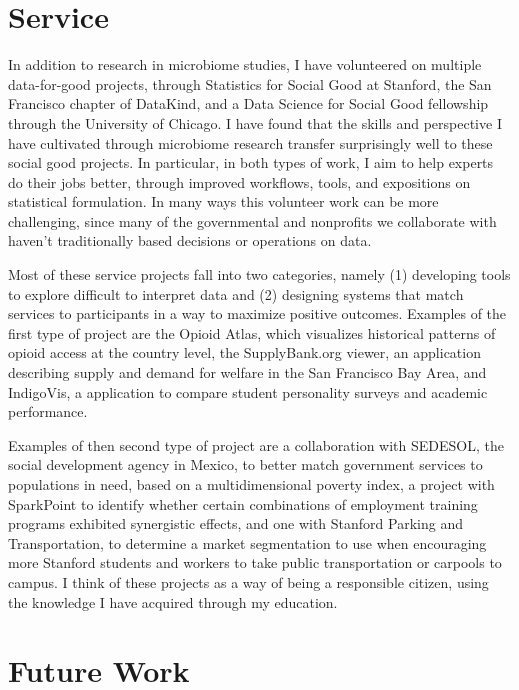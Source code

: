 \documentclass{article}
\begin{document}
\section{Service}

In addition to research in microbiome studies, I have volunteered on multiple
data-for-good projects, through Statistics for Social Good at Stanford, the San
Francisco chapter of DataKind, and a Data Science for Social Good fellowship
through the University of Chicago. I have found that the skills and perspective
I have cultivated through microbiome research transfer surprisingly well to
these social good projects. In particular, in both types of work, I aim to help
experts do their jobs better, through improved workflows, tools, and expositions
on statistical formulation. In many ways this volunteer work can be more
challenging, since many of the governmental and nonprofits we collaborate with
haven't traditionally based decisions or operations on data.

Most of these service projects fall into two categories, namely (1) developing
tools to explore difficult to interpret data and (2) designing systems that
match services to participants in a way to maximize positive outcomes. Examples
of the first type of project are the Opioid Atlas, which visualizes historical
patterns of opioid access at the country level, the SupplyBank.org viewer, an
application describing supply and demand for welfare in the San Francisco Bay
Area, and IndigoVis, a application to compare student personality surveys and
academic performance.

Examples of then second type of project are a collaboration with SEDESOL, the
social development agency in Mexico, to better match government services to
populations in need, based on a multidimensional poverty index, a project with
SparkPoint to identify whether certain combinations of employment training
programs exhibited synergistic effects, and one with Stanford Parking and
Transportation, to determine a market segmentation to use when encouraging more
Stanford students and workers to take public transportation or carpools to
campus. I think of these projects as a way of being a responsible citizen, using
the knowledge I have acquired through my education.

\section{Future Work}
\end{document}
